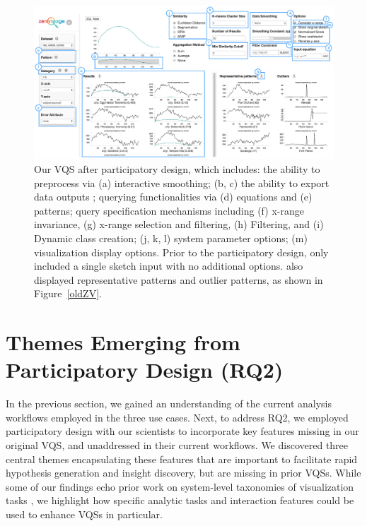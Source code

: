 \begin{figure}[ht!]
\centering
\vspace{-15pt}
\includegraphics[width=\linewidth]{figures/newZV.pdf} %
\vspace{-5pt}\caption{Our VQS after participatory design, which includes: the ability to preprocess via (a) interactive smoothing; (b, c) the ability to export data outputs ; querying functionalities via (d) equations and (e) patterns; query specification mechanisms including (f) x-range invariance, (g) x-range selection and filtering, (h) Filtering, and (i) Dynamic class creation; (j, k, l) system parameter options; (m) visualization display options. Prior to the participatory design, \zv only included a single sketch input with no additional options. \zv also displayed representative patterns and outlier patterns, as shown in Figure~\ref{oldZV}.}
\label{zvOverview}
\vspace{-14pt}
\end{figure}
\section{Themes Emerging from Participatory Design (RQ2)}\label{findings}
\par In the previous section, we gained an understanding of the current analysis workflows employed in the three use cases. Next, to address RQ2, we employed participatory design with our scientists to incorporate key features  missing in our original VQS, and unaddressed in their
current workflows. We discovered three central themes encapsulating these features that are important to facilitate rapid hypothesis generation and insight discovery, but are missing in prior VQSs. While some of our findings echo prior work on system-level taxonomies of visualization tasks \cite{Amar2005,Heer2012}, we highlight how specific analytic tasks and interaction features could be used to enhance VQSs in particular. 
